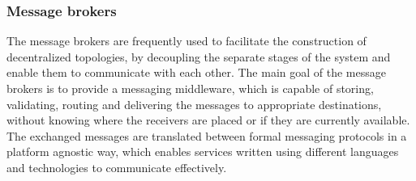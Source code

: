 


\subsubsection{Message brokers} \label{chapter:message-brokers}

The message brokers are frequently used to facilitate the construction of decentralized topologies, by decoupling the separate stages of the system and enable them to communicate with each other. The main goal of the message brokers is to provide a messaging middleware, which is capable of storing, validating, routing and delivering the messages to appropriate destinations, without knowing where the receivers are placed or if they are currently available. The exchanged messages are translated between formal messaging protocols in a platform agnostic way, which enables services written using different languages and technologies to communicate effectively.

